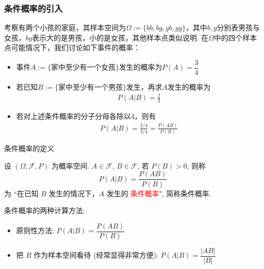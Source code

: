 \begin{frame}
	\frametitle{条件概率的引入}
	\begin{exam}
		考察有两个小孩的家庭，其样本空间为$\Omega:=\{bb,bg,gb,gg\}$，其中$b, g$分别表男孩与女孩，$bg$表示大的是男孩，小的是女孩，其他样本点类似说明. 在$\Omega$中的四个样本点可能情况下，我们讨论如下事件的概率：
		\vspace{0.2cm}
		\begin{itemize}[<+-|alert@+>]
			\item 事件$A:=\{\mbox{家中至少有一个女孩}\}$发生的概率为$P(A)=\dfrac{3}{4}$
			\item 若已知$B:=\{\mbox{家中至少有一个男孩}\}$发生，再求$A$发生的概率为
			\begin{eqnarray*}
				P(A|B)=\frac{2}{3}
			\end{eqnarray*}
			\item 若对上述条件概率的分子分母各除以4，则有
			\begin{eqnarray*}
				P(A|B)=\frac{2/4}{3/4}=\frac{P(AB)}{P(B)}
			\end{eqnarray*}
		\end{itemize}
	\end{exam}

	\end{frame}

\begin{frame}{条件概率的定义}
	\begin{defi}
		设 $(\Omega,\mathcal{F},P)$ 为概率空间. $A\in\mathcal{F}$, $B\in\mathcal{F}$, 若 $P (B)>0$, 则称 $$P (A|B)=\frac{P (AB)}{P (B)}$$ 为 ``在已知 $B$ 发生的情况下，$A$ 发生的 \textcolor{red}{条件概率}", 简称条件概率.
	\end{defi}
	\pause
	\vspace{0.4cm}
	\begin{rmk} 条件概率的两种计算方法:
		\begin{itemize}[<+-|alert@+>]
			\item 原则性方法: $P (A|B)=\dfrac{P (AB)}{P (B)}$
			\item 把 $B$ 作为样本空间看待 (经常显得非常方便): $P (A|B)=\dfrac{|AB|}{|B|}$
		\end{itemize}
	\end{rmk}
\end{frame}


